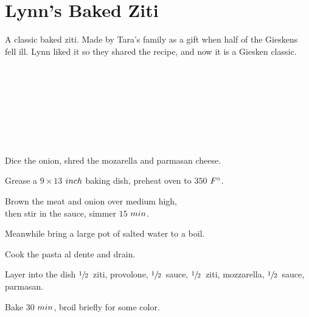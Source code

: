 \section[Baked Ziti]{Lynn's Baked Ziti}

\begin{recipestats}[
        servings=10,
        preptime=15~\minute,
        bakingtime=45~\minute,
        original=\citeauthor{allRecipesZiti}~\cite{allRecipesZiti},
    ]
\end{recipestats}

\begin{recipeabstract}
    A classic baked ziti.
    Made by Tara's family as a gift when half of the Gieskens fell ill.
    Lynn liked it so they shared the recipe, and now it is a Giesken classic.
\end{recipeabstract}

\begin{ingredientcolumns}
    \begin{ingredientblock}
        \\
        \\
        \\
    \end{ingredientblock}
    \begin{ingredientblock}
        \\
        \\
        \\
    \end{ingredientblock}
\end{ingredientcolumns}

\begin{preparation}
\item Dice the onion, shred the mozarella and parmasan cheese.
\item Grease a $9\times13$ $\inch$ baking dish, preheat oven to $350$ $\Fahrenheit$.
\item Brown the meat and onion over medium high,\\then stir in the sauce, simmer $15$ $\minute$.
\item Meanwhile bring a large pot of salted water to a boil.
\item Cook the pasta al dente and drain.
\item Layer into the dish $\onehalf$~ziti, provolone, $\onehalf$~sauce,
    $\onehalf$~ziti, mozzarella, $\onehalf$~sauce, parmasan.
\item Bake $30$ $\minute$, broil briefly for some color.
\end{preparation}

\recipeend%

